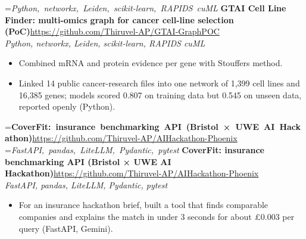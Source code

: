 \documentclass[a4paper,11pt]{article}
\newcommand{\project}[3]{%
  \textbf{#1}\hfill#3\\ {\color{muted}\small\textit{#2}}\par}
\newcommand{\gap}{\vspace{5pt}}
\begin{document}
=\hbox{{\small\textit{Python, networkx, Leiden, scikit-learn, RAPIDS cuML}}}%
\ifdim\wd0>\linewidth
\ifdim\wd2>\linewidth
\textbf{GTAI Cell Line Finder: multi-omics graph for cancer cell-line selection (PoC)}\\ {\color{muted}\small\textit{Python, networkx, Leiden, scikit-learn, RAPIDS cuML}}\\ \hspace*{\fill}{\small\url{https://github.com/Thiruvel-AP/GTAI-GraphPOC}}\par
\else
\textbf{GTAI Cell Line Finder: multi-omics graph for cancer cell-line selection (PoC)}\\ {\color{muted}\small\textit{Python, networkx, Leiden, scikit-learn, RAPIDS cuML}}\hfill{\small\url{https://github.com/Thiruvel-AP/GTAI-GraphPOC}}\par
\fi
\else
\project{GTAI Cell Line Finder: multi-omics graph for cancer cell-line selection (PoC)}{Python, networkx, Leiden, scikit-learn, RAPIDS cuML}{\url{https://github.com/Thiruvel-AP/GTAI-GraphPOC}}
\fi
\begin{itemize}
  \item Combined mRNA and protein evidence per gene with Stouffer\textquotesingle{}s method.
  \item Linked 14 public cancer-research files into one network of 1,399 cell lines and 16,385 genes; models scored 0.807 on training data but 0.545 on unseen data, reported openly (Python).
\end{itemize}
\gap
{}
=\hbox{\textbf{CoverFit: insurance benchmarking API (Bristol × UWE AI Hackathon)}\hspace{1em}\url{https://github.com/Thiruvel-AP/AIHackathon-Phoenix}}%
=\hbox{{\small\textit{FastAPI, pandas, LiteLLM, Pydantic, pytest}}}%
\ifdim\wd0>\linewidth
\ifdim\wd2>\linewidth
\textbf{CoverFit: insurance benchmarking API (Bristol × UWE AI Hackathon)}\\ {\color{muted}\small\textit{FastAPI, pandas, LiteLLM, Pydantic, pytest}}\\ \hspace*{\fill}{\small\url{https://github.com/Thiruvel-AP/AIHackathon-Phoenix}}\par
\else
\textbf{CoverFit: insurance benchmarking API (Bristol × UWE AI Hackathon)}\\ {\color{muted}\small\textit{FastAPI, pandas, LiteLLM, Pydantic, pytest}}\hfill{\small\url{https://github.com/Thiruvel-AP/AIHackathon-Phoenix}}\par
\fi
\else
\project{CoverFit: insurance benchmarking API (Bristol × UWE AI Hackathon)}{FastAPI, pandas, LiteLLM, Pydantic, pytest}{\url{https://github.com/Thiruvel-AP/AIHackathon-Phoenix}}
\fi
\begin{itemize}
  \item For an insurance hackathon brief, built a tool that finds comparable companies and explains the match in under 3 seconds for about £0.003 per query (FastAPI, Gemini).
\end{itemize}
\end{document}

